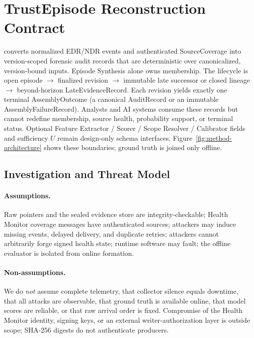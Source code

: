\section{TrustEpisode Reconstruction Contract}
\label{sec:method}

\trustepisode converts normalized EDR/NDR events and authenticated SourceCoverage into
version-scoped forensic audit records that are deterministic over canonicalized, version-bound
inputs. Episode Synthesis alone owns membership. The lifecycle is open episode $\rightarrow$
finalized revision $\rightarrow$ immutable late successor or closed lineage $\rightarrow$
beyond-horizon LateEvidenceRecord. Each revision yields exactly one terminal AssemblyOutcome
(a canonical AuditRecord or an immutable AssemblyFailureRecord). Analysts and AI systems consume
these records but cannot redefine membership, source health, probability support, or terminal status.
Optional Feature Extractor / Scorer / Scope Resolver / Calibrator fields and sufficiency $U$ remain
design-only schema interfaces. Figure~\ref{fig:method-architecture} shows these boundaries; ground
truth is joined only offline.

\subsection{Investigation and Threat Model}
\label{sec:threat-model}

\paragraph{Assumptions.}
Raw pointers and the sealed evidence store are integrity-checkable; Health Monitor coverage
messages have authenticated sources; attackers may induce missing events, delayed delivery, and
duplicate retries; attackers cannot arbitrarily forge signed health state; runtime software may
fault; the offline evaluator is isolated from online formation.

\paragraph{Non-assumptions.}
We do \emph{not} assume complete telemetry, that collector silence equals downtime, that all
attacks are observable, that ground truth is available online, that model scores are reliable, or
that raw arrival order is fixed. Compromise of the Health Monitor identity, signing keys, or an
external writer-authorization layer is outside scope; SHA-256 digests do not authenticate producers.

